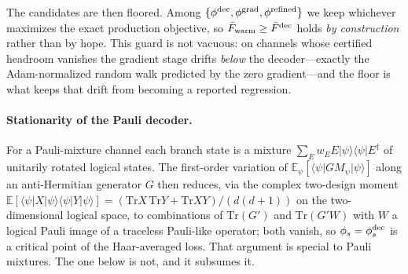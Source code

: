 \documentclass[aps,prxquantum,reprint,superscriptaddress]{revtex4-2}
\newcommand{\ket}[1]{\lvert #1\rangle}
\newcommand{\bra}[1]{\langle #1\rvert}
\newcommand{\tr}{\mathrm{Tr}}
\begin{document}
The candidates are then floored. Among
$\{\phi^{\rm dec},\phi^{\rm grad},\phi^{\rm refined}\}$ we keep whichever
maximizes the exact production objective, so
$\bar F_{\rm warm}\ge\bar F^{\rm dec}$ holds \emph{by construction} rather than
by hope. This guard is not vacuous: on channels whose certified headroom vanishes
the gradient stage drifts \emph{below} the decoder---exactly the
Adam-normalized random walk predicted by the zero gradient---and the floor is
what keeps that drift from becoming a reported regression.

\paragraph{Stationarity of the Pauli decoder.}
For a Pauli-mixture channel each branch state is a mixture
$\sum_E w_E E\ket{\psi}\bra{\psi}E^\dagger$ of unitarily rotated logical
states. The first-order variation of $\mathbb{E}_\psi[\bra{\psi}G M_\psi
\ket{\psi}]$ along an anti-Hermitian generator $G$ then reduces, via the
complex two-design moment
$\mathbb{E}[\bra{\psi}X\ket{\psi}\bra{\psi}Y\ket{\psi}]=(\tr X\,\tr Y+
\tr XY)/(d(d+1))$ on the two-dimensional logical space, to combinations of
$\tr(G')$ and $\tr(G'W)$ with $W$ a logical Pauli image of a traceless
Pauli-like operator; both vanish, so $\phi_s=\phi^{\rm dec}_s$ is a critical
point of the Haar-averaged loss. That argument is special to Pauli mixtures. The
one below is not, and it subsumes it.
\end{document}
